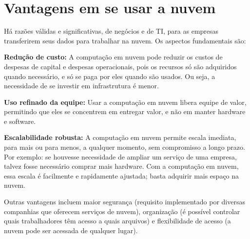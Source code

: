 \section{Vantagens em se usar a nuvem}

Há razões válidas e significativas, de negócios e de TI, para as empresas transferirem
seus dados para trabalhar na nuvem. Os aspectos fundamentais são:

\newcommand{\itemm}[1]{\item\textbf{#1}}

\begin{itemise}
    \itemm{Redução de custo:} A computação em nuvem pode reduzir os custos de
        despesas de capital e despesas operacionais, pois os recursos só são adquiridos
        quando necessário, e só se paga por eles quando são usados. Ou seja, a necessidade
        de se investir em infrastrutura é menor.

    \itemm{Uso refinado da equipe:} Usar a computação em nuvem libera equipe de
        valor, permitindo que eles se concentrem em entregar valor, e não em manter
        hardware e software.

    \itemm {Escalabilidade robusta:} A computação em nuvem permite escala imediata,
        para mais ou para menos, a qualquer momento, sem compromisso a longo prazo.
        Por exemplo: se houvesse necessidade de ampliar um serviço de uma empresa, talvez
        fosse necessário comprar mais hardware. Com a computação em nuvem, essa escala
        é facilmente e rapidamente ajustada; basta adquirir mais espaço na nuvem.

\end{itemise}

Outras vantagens incluem maior segurança (requisito implementado por diversas companhias que
oferecem serviços de nuvem), organização (é possível controlar quais trabalhadores têm acesso
a quais arquivos) e flexibilidade de acesso (a nuvem pode ser acessada de qualquer lugar).

\undef\itemm

